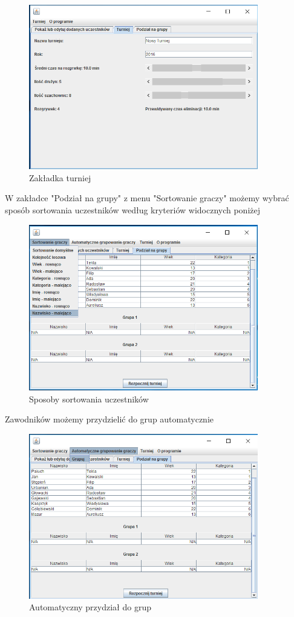 \begin{figure}[H]
	\centering
	\includegraphics[width=10cm]{fig/7}
	\caption{Zakładka turniej}
	\label {fig:zakladka_turniej} 
\end{figure}
W zakładce "Podział na grupy" z menu "Sortowanie graczy" możemy wybrać sposób sortowania uczestników według kryteriów widocznych poniżej
\begin{figure}[H]
	\centering
	\includegraphics[width=10cm]{fig/8}
	\caption{Sposoby sortowania uczestników}
	\label {fig:Sposoby_sortowania_uczestnikow} 
\end{figure}
Zawodników możemy przydzielić do grup automatycznie
\begin{figure}[H]
	\centering
	\includegraphics[width=10cm]{fig/9}
	\caption{Automatyczny przydział do grup}
	\label {fig:Automatyczny_przydzial_do_grup} 
\end{figure}
